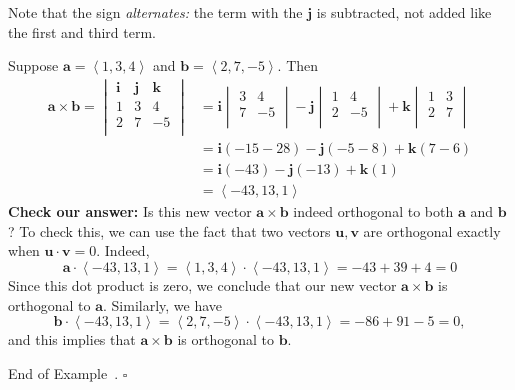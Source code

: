 \documentclass[10pt]{article}
\theoremstyle{definition}
\newtheorem{example}[theorem]{Example}
\renewenvironment{example}
{\begin{oldexample}}
  {\par\smallskip\hfill   End of Example~\theexample. $\square$    \par\end{oldexample}}
\newcommand{\1}[1]{\textbf{1}_{\left[#1\right]}} %
\begin{document}
Note that the sign \textit{alternates:} the term with the $\mathbf{j}$ is subtracted, not
added like the first and third term.
\begin{example}
  Suppose $\mathbf{a} = \left\langle 1,3,4 \right\rangle $ and $\mathbf{b} = \left\langle 2,7,-5 \right\rangle$.
  Then
  \begin{align*} 
    \mathbf{a}\times \mathbf{b}
    =
    \begin{vmatrix}
      \mathbf{i}&\mathbf{j}&\mathbf{k}\\
      1&3&4\\
      2&7&-5\\
    \end{vmatrix}
                  &=
                    \mathbf{i}
                    \begin{vmatrix}
                      3&4\\
                      7&-5\\
                    \end{vmatrix}
    -
    \mathbf{j}
    \begin{vmatrix}
      1&4\\
      2&-5\\
    \end{vmatrix}
    +
    \mathbf{k}
    \begin{vmatrix}
      1&3\\
      2&7\\
    \end{vmatrix}\\
                  &=\mathbf{i} \left(-15-28  \right) - \mathbf{j}\left( -5-8 \right) +\mathbf{k}\left( 7-6 \right)\\
                  &=\mathbf{i} \left(-43  \right) - \mathbf{j}\left( -13 \right) +\mathbf{k}\left(1 \right)\\
                  &=\left\langle -43,13,1 \right\rangle 
  \end{align*}
  \textbf{Check our answer:} Is this new vector $\mathbf{a}\times \mathbf{b}$
  indeed orthogonal to both $\mathbf{a}$ and $\mathbf{b}$? To check this, we
  can use the fact that two vectors $\mathbf{u},\mathbf{v}$ are orthogonal
  exactly when $\mathbf{u}\cdot \mathbf{v}=0$. Indeed,
  \begin{equation*}
    \mathbf{a} \cdot \left\langle -43,13,1
    \right\rangle= \left\langle 1,3,4  \right\rangle \cdot \left\langle -43,13,1
    \right\rangle= -43+39+4 = 0
  \end{equation*}
  Since this dot product is zero, we conclude that our new vector $\mathbf{a}\times \mathbf{b}$ is orthogonal to $\mathbf{a}$.
  Similarly, we have
  \begin{equation*}
    \mathbf{b}\cdot \left\langle -43,13,1 \right\rangle= \left\langle 2,7,-5 \right\rangle\cdot \left\langle -43,13,1
    \right\rangle= -86+91-5 =0,
  \end{equation*}
  and this implies that $\mathbf{a}\times \mathbf{b}$ is orthogonal to $\mathbf{b}$.
\end{example}
\end{document}
